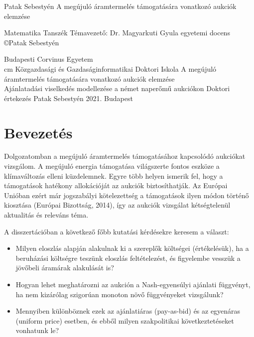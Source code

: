 \documentclass[twoside, magyar, showtrims]{corvinusphd}
\renewcommand{\author}{Patak Sebestyén}
\renewcommand{\title}{A megújuló áramtermelés támogatására vonatkozó aukciók elemzése}
\newcommand{\department}{Matematika Tanszék}
\newcommand{\advisor}{Dr. Magyarkuti Gyula egyetemi docens}
\newcommand{\BCE}{Budapesti Corvinus Egyetem}
\newcommand{\school}{Közgazdasági és Gazdaságinformatikai Doktori Iskola}
\newcommand{\subtitle}{Ajánlatadási viselkedés modellezése a német naperőmű aukciókon}
\newcommand{\submitted}{2021. Budapest}
\theoremstyle{plain}
\theoremstyle{remark}
\theoremstyle{definition}
\begin{document}
\frontmatter*
\thispagestyle{empty}
\begin{center}
\vspace*{\fill}
    \Large{{\author}}
    \vskip 2cm
    \large{{\title}}
\vspace*{\fill}
\end{center}
\newpage

\thispagestyle{empty}
\begin{center}
    \department
    \vskip 4cm
    Témavezető: \advisor
    \vskip 15cm
    \copyright\author
\end{center}
\newpage

\thispagestyle{empty}
\begin{center}
    \BCE \\
    cm
    \school 
    \vskip 4cm
  \Large{{\title}} \\
  
    \large{\subtitle}
    \vskip 5cm    
    Doktori értekezés 
    \vskip 2cm
    \author
    \vskip 4cm
    \submitted
 \end{center}
\cleardoublepage

\tableofcontents*
\listoffigures
\listoftables

\mainmatter*
\chapter{Bevezetés}

\scwords Dolgozatomban a megújuló áramtermelés támogatásához kapcsolódó aukciókat vizsgálom.
A megújuló energia támogatása világszerte
fontos eszköze a klímaváltozás elleni küzdelemnek.
Egyre több helyen ismerik fel, hogy
a támogatások hatékony allokációját az aukciók
biztosíthatják. Az Európai Unióban ezért már jogszabályi kötelezettség
a támogatások ilyen módon történő kiosztása (Európai Bizottság, 2014),
így az aukciók vizsgálat kétségtelenül aktualitás és releváns téma.

A disszertációban a következő főbb kutatási kérdésekre keresem a választ:

\begin{itemize}
    \item
    Milyen eloszlás alapján alakulnak ki a szereplők költségei (értékelésük), ha a beruházási költségre teszünk eloszlás feltételezést, és figyelembe vesszük a jövőbeli áramárak alakulását is?
    \item
    Hogyan lehet meghatározni az aukción a Nash-egyensúlyi ajánlati függvényt, ha nem kizárólag szigorúan monoton növő függvényeket vizsgálunk?
    \item
    Mennyiben különböznek ezek az ajánlatiáras (pay-as-bid) és az egyenáras (uniform price) esetben, és ebből milyen szakpolitikai következtetéseket vonhatunk le? 
\end{itemize}
\end{document}
